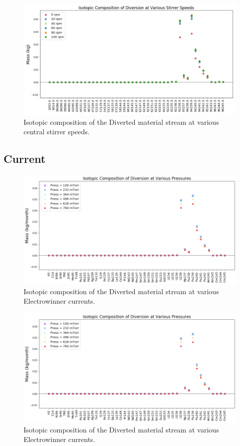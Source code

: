 \begin{figure}
	\includegraphics[width=\linewidth]{images/ref-rot-comp}
	\caption{Isotopic composition of the Diverted material stream at various central stirrer speeds.}
	\label{fig:ref-rot-diff}
\end{figure}

\subsection{Current}

\begin{figure}
	\includegraphics[width=\linewidth]{images/pressure-sa-comp}
	\caption{Isotopic composition of the Diverted material stream at various Electrowinner currents.}
	\label{fig:win-cur-sa}
\end{figure}

\begin{figure}
	\includegraphics[width=\linewidth]{images/pressure-sa-comp}
	\caption{Isotopic composition of the Diverted material stream at various Electrowinner currents.}
	\label{fig:win-cur-diff}
\end{figure}

